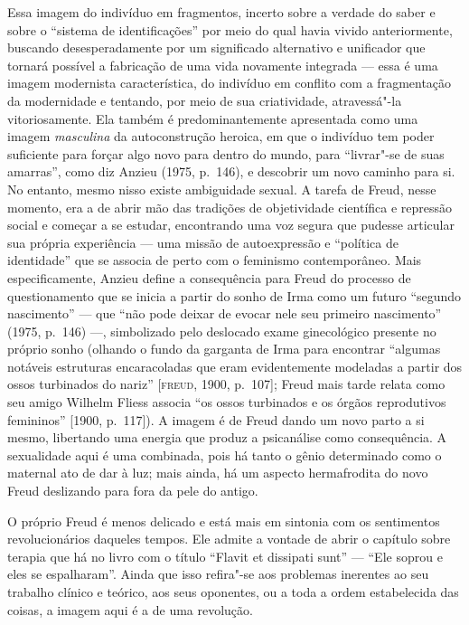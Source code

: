 Essa imagem do indivíduo em fragmentos, incerto sobre a verdade do saber
e sobre o ``sistema de identificações'' por meio do qual havia vivido
anteriormente, buscando desesperadamente por um significado alternativo
e unificador que tornará possível a fabricação de uma vida novamente
integrada --- essa é uma imagem modernista característica, do indivíduo
em conflito com a fragmentação da modernidade e tentando, por meio de
sua criatividade, atravessá"-la vitoriosamente. Ela também é
predominantemente apresentada como uma imagem \emph{masculina} da
autoconstrução heroica, em que o indivíduo tem poder suficiente para
forçar algo novo para dentro do mundo, para ``livrar"-se de suas
amarras'', como diz Anzieu (1975, p.~146), e descobrir um novo caminho para si.
No entanto, mesmo nisso existe ambiguidade sexual. A tarefa de Freud,
nesse momento, era a de abrir mão das tradições de objetividade
científica e repressão social e começar a se estudar, encontrando uma
voz segura que pudesse articular sua própria experiência --- uma missão
de autoexpressão e ``política de identidade'' que se associa de perto
com o feminismo contemporâneo. Mais especificamente, Anzieu define a
consequência para Freud do processo de questionamento que se inicia a
partir do sonho de Irma como um futuro ``segundo nascimento'' --- que ``não
pode deixar de evocar nele seu primeiro nascimento'' (1975, p.~146) ---,
simbolizado pelo deslocado exame ginecológico presente no próprio sonho
(olhando o fundo da garganta de Irma para encontrar ``algumas notáveis
estruturas encaracoladas que eram evidentemente modeladas a partir dos
ossos turbinados do nariz'' {[}\textsc{freud}, 1900, p.~107{]}; Freud mais tarde
relata como seu amigo Wilhelm Fliess associa ``os ossos
turbinados e os órgãos reprodutivos femininos'' {[}1900, p.~117{]}). A imagem é de Freud
dando um novo parto a si mesmo, libertando uma energia que produz a
psicanálise como consequência. A sexualidade aqui é uma combinada, pois
há tanto o gênio determinado como o maternal ato de dar à luz; mais
ainda, há um aspecto hermafrodita do novo Freud deslizando para fora da
pele do antigo.

O próprio Freud é menos delicado e está mais em sintonia com os
sentimentos revolucionários daqueles tempos. Ele admite a vontade de
abrir o capítulo sobre terapia que há no livro com o título ``Flavit et
dissipati sunt'' --- ``Ele soprou e eles se espalharam''. Ainda que isso
refira"-se aos problemas inerentes ao seu trabalho clínico e teórico, aos
seus oponentes, ou a toda a ordem estabelecida das coisas, a imagem aqui
é a de uma revolução.

